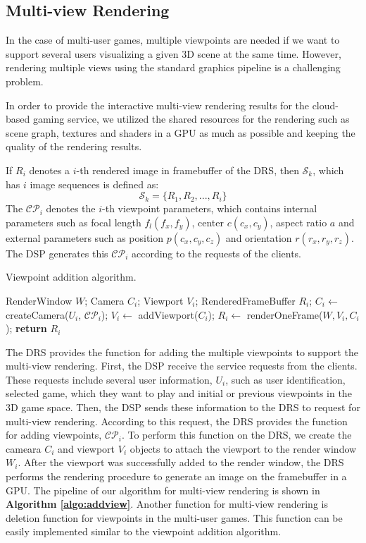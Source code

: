 \documentclass[conference]{IEEEtran}
\begin{document}
    \subsection{Multi-view Rendering}
    \label{sub:multiview}
    In the case of multi-user games, multiple viewpoints are needed if we want to support several users visualizing a given 3D scene at the same time.
    However, rendering multiple views using the standard graphics pipeline is a challenging problem.

    In order to provide the interactive multi-view rendering results for the cloud-based gaming service,
    we utilized the shared resources for the rendering such as scene graph, textures and shaders in a GPU as much as possible and keeping the quality of the rendering results.

    If $R_i$ denotes a $i$-th rendered image in framebuffer of the DRS, then $\mathcal{S}_k$, which has $i$ image sequences is defined as:
    $$ \mathcal{S}_k = \{R_1, R_2, ... , R_i \} $$
    The $\mathcal{CP}_i$ denotes the $i$-th viewpoint parameters, which contains internal parameters
    such as focal length $f_l(f_x, f_y)$, center $c(c_x, c_y)$, aspect ratio $a$ and external parameters
    such as position $p(c_x, c_y, c_z)$ and orientation $r(r_x, r_y, r_z)$. The DSP generates this $\mathcal{CP}_i$ according to the requests of the clients.
    \begin{algorithm}
    \caption{Viewpoint addition algorithm.}
    \label{algo:addview}
    \begin{algorithmic}[1]
       \State RenderWindow $W$;
       \State Camera $C_i$;
       \State Viewport $V_i$;
       \State RenderedFrameBuffer $R_i$;
       \State $C_i \gets$ createCamera($U_i$, $\mathcal{CP}_i$);
       \State $V_i \gets$ addViewport($C_i$);
       \State $R_i \gets$ renderOneFrame($W, V_i, C_i$);
       \State \textbf{return} $R_i$
    \EndProcedure
    \end{algorithmic}
    \end{algorithm}

    The DRS provides the function for adding the multiple viewpoints to support the multi-view rendering.
    First, the DSP receive the service requests from the clients. These requests include several user information, $U_i$, such as user identification, selected game, which they want to play and initial or previous viewpoints in the 3D game space. Then, the DSP sends these information to the DRS to request for multi-view rendering. According to this request, the DRS provides the function for adding viewpoints, $\mathcal{CP}_i$. To perform this function on the DRS, we create the cameara $C_i$ and viewport $V_i$ objects to attach the viewport to the render window $W_i$. After the viewport was successfully added to the render window, the DRS performs the rendering procedure to generate an image on the framebuffer in a GPU. The pipeline of our algorithm for multi-view rendering is shown in \textbf{Algorithm \ref{algo:addview}}.
    Another function for multi-view rendering is deletion function for viewpoints in the multi-user games. This function can be easily implemented similar to the viewpoint addition algorithm.
\end{document}

